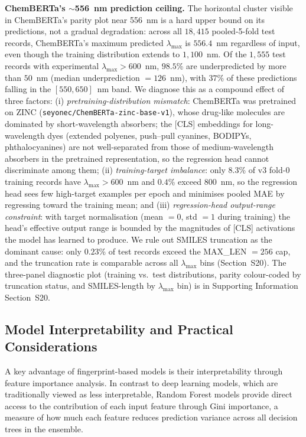 \documentclass[journal=jcisd8,manuscript=article]{achemso}
\newcommand{\added}[1]{{\color{addedblue}#1}}
\begin{document}
\added{\textbf{ChemBERTa's $\sim$556~nm prediction ceiling.} The horizontal cluster visible in ChemBERTa's parity plot near 556~nm is a hard upper bound on its predictions, not a gradual degradation: across all $18{,}415$ pooled-5-fold test records, ChemBERTa's maximum predicted $\lambda_{\max}$ is $556.4$~nm regardless of input, even though the training distribution extends to $1{,}100$~nm. Of the $1{,}555$ test records with experimental $\lambda_{\max} > 600$~nm, $98.5$\% are underpredicted by more than $50$~nm (median underprediction $= 126$~nm), with $37$\% of these predictions falling in the $[550, 650]$~nm band. We diagnose this as a compound effect of three factors: (i) \emph{pretraining-distribution mismatch}: ChemBERTa was pretrained on ZINC (\texttt{seyonec/ChemBERTa-zinc-base-v1}), whose drug-like molecules are dominated by short-wavelength absorbers; the [CLS] embeddings for long-wavelength dyes (extended polyenes, push--pull cyanines, BODIPYs, phthalocyanines) are not well-separated from those of medium-wavelength absorbers in the pretrained representation, so the regression head cannot discriminate among them; (ii) \emph{training-target imbalance}: only $8.3$\% of v3 fold-0 training records have $\lambda_{\max} > 600$~nm and $0.4$\% exceed $800$~nm, so the regression head sees few high-target examples per epoch and minimises pooled MAE by regressing toward the training mean; and (iii) \emph{regression-head output-range constraint}: with target normalisation (mean $= 0$, std $= 1$ during training) the head's effective output range is bounded by the magnitudes of [CLS] activations the model has learned to produce. We rule out SMILES truncation as the dominant cause: only $0.23$\% of test records exceed the MAX\_LEN $= 256$ cap, and the truncation rate is comparable across all $\lambda_{\max}$ bins (Section~S20). The three-panel diagnostic plot (training vs.\ test distributions, parity colour-coded by truncation status, and SMILES-length by $\lambda_{\max}$ bin) is in Supporting Information Section~S20.}


\subsection{Model Interpretability and Practical Considerations}
\label{sec:interpretability}

A key advantage of fingerprint-based models is their interpretability through feature importance analysis.
In contrast to deep learning models, which are traditionally viewed as less interpretable, Random Forest models provide direct access to the contribution of each input feature through Gini importance, a measure of how much each feature reduces prediction variance across all decision trees in the ensemble.
\end{document}
